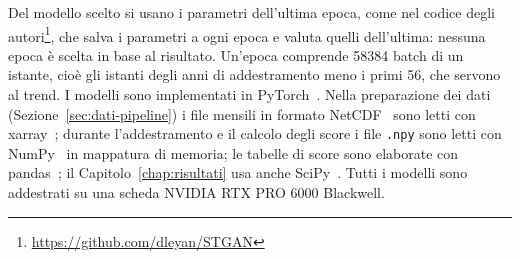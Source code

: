 Del modello scelto si usano i parametri dell'ultima epoca, come nel codice degli autori\footnote{\url{https://github.com/dleyan/STGAN}}, che salva i parametri a ogni epoca e valuta quelli dell'ultima: nessuna epoca è scelta in base al risultato. Un'epoca comprende 58384 batch di un istante, cioè gli istanti degli anni di addestramento meno i primi 56, che servono al trend. I modelli sono implementati in PyTorch~\cite{paszke2019pytorch}. Nella preparazione dei dati (Sezione~\ref{sec:dati-pipeline}) i file mensili in formato NetCDF~\cite{rew1990netcdf} sono letti con xarray~\cite{hoyer2017xarray}; durante l'addestramento e il calcolo degli score i file \texttt{.npy} sono letti con NumPy~\cite{harris2020numpy} in mappatura di memoria; le tabelle di score sono elaborate con pandas~\cite{mckinney2010pandas}; il Capitolo~\ref{chap:risultati} usa anche SciPy~\cite{virtanen2020scipy}. Tutti i modelli sono addestrati su una scheda NVIDIA RTX PRO 6000 Blackwell.

